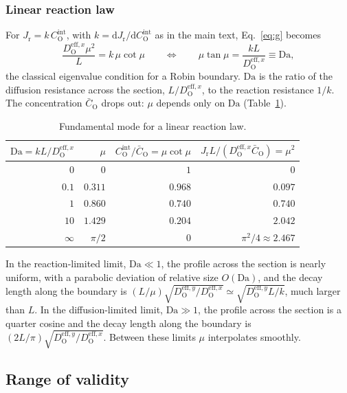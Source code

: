 \documentclass[12pt]{article}
\newcommand{\eff}{\mathrm{eff}}
\newcommand{\intf}{\mathrm{int}}
\newcommand{\Ox}{\mathrm{O}}
\newcommand{\Dx}{D_{\Ox}^{\eff,x}}
\newcommand{\Dy}{D_{\Ox}^{\eff,y}}
\newcommand{\Cb}{\bar{C}_{\Ox}}
\newcommand{\Ci}{C_{\Ox}^{\intf}}
\newcommand{\Jr}{J_{\mathrm{r}}}
\newcommand{\dd}{\mathrm{d}}
\begin{document}
\subsubsection{Linear reaction law}
\label{sec:linear}

For \(\Jr=k\,\Ci\), with \(k=\dd\Jr/\dd\Ci\) as in the main text,
Eq.~\eqref{eq:g} becomes
\begin{equation}
\frac{\Dx\mu^2}{L}=k\,\mu\cot\mu
\qquad\Longleftrightarrow\qquad
\mu\tan\mu=\frac{kL}{\Dx}\equiv\mathrm{Da},
\label{eq:mu-linear}
\end{equation}
the classical eigenvalue condition for a Robin boundary. \(\mathrm{Da}\) is
the ratio of the diffusion resistance across the section, \(L/\Dx\), to the
reaction resistance \(1/k\). The concentration \(\Cb\) drops out: \(\mu\)
depends only on \(\mathrm{Da}\) (Table~\ref{tab:mu}).

\begin{table}[h]
\centering
\caption{Fundamental mode for a linear reaction law.}
\label{tab:mu}
\begin{tabular}{rrrr}
\toprule
$\mathrm{Da}=kL/\Dx$ & $\mu$ & $\Ci/\Cb=\mu\cot\mu$ & $\Jr L/(\Dx\Cb)=\mu^2$ \\
\midrule
$0$      & $0$     & $1$     & $0$ \\
$0.1$    & $0.311$ & $0.968$ & $0.097$ \\
$1$      & $0.860$ & $0.740$ & $0.740$ \\
$10$     & $1.429$ & $0.204$ & $2.042$ \\
$\infty$ & $\pi/2$ & $0$     & $\pi^2/4\approx2.467$ \\
\bottomrule
\end{tabular}
\end{table}

In the reaction-limited limit, \(\mathrm{Da}\ll1\), the profile across the
section is nearly uniform, with a parabolic deviation of relative size
\(O(\mathrm{Da})\), and the decay length along the boundary is
\((L/\mu)\sqrt{\Dy/\Dx}\simeq\sqrt{\Dy L/k}\), much larger than \(L\). In the
diffusion-limited limit, \(\mathrm{Da}\gg1\), the profile across the section
is a quarter cosine and the decay length along the boundary is
\((2L/\pi)\sqrt{\Dy/\Dx}\). Between these limits \(\mu\) interpolates
smoothly.

\subsection{Range of validity}
\label{sec:validity}
\end{document}
